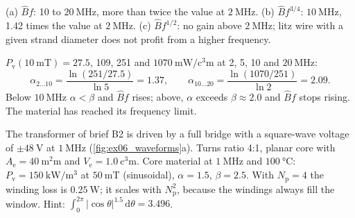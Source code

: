 
\begin{solutionblock}
	(a) $\hat{B}f$: 10 to $\SI{20}{\mega\hertz}$, more than twice the value at $\SI{2}{\mega\hertz}$. (b) $\hat{B}f^{3/4}$: $\SI{10}{\mega\hertz}$, 1.42 times the value at $\SI{2}{\mega\hertz}$. (c) $\hat{B}f^{1/2}$: no gain above $\SI{2}{\mega\hertz}$; litz wire with a given strand diameter does not profit from a higher frequency.
\end{solutionblock}


\begin{solutionblock}
	$P_\mathrm{v}(\SI{10}{\milli\tesla})=27.5$, 109, 251 and $\SI{1070}{\milli\watt\per\cubic\centi\metre}$ at 2, 5, 10 and $\SI{20}{\mega\hertz}$:
	\begin{equation}
		\alpha_{2\ldots10}=\frac{\ln(251/27.5)}{\ln5}=1.37,\qquad\alpha_{10\ldots20}=\frac{\ln(1070/251)}{\ln2}=2.09.
	\end{equation}
	Below $\SI{10}{\mega\hertz}$ $\alpha<\beta$ and $\hat{B}f$ rises; above, $\alpha$ exceeds $\beta\approx2.0$ and $\hat{B}f$ stops rising. The material has reached its frequency limit.
\end{solutionblock}



The transformer of brief B2 is driven by a full bridge with a square-wave voltage of $\pm\SI{48}{\volt}$ at $\SI{1}{\mega\hertz}$ (\autoref{fig:ex06_waveforms}a). Turns ratio 4:1, planar core with $A_\mathrm{e}=\SI{40}{\square\milli\metre}$ and $V_\mathrm{e}=\SI{1.0}{\cubic\centi\metre}$. Core material at $\SI{1}{\mega\hertz}$ and $\SI{100}{\celsius}$: $P_\mathrm{v}=\SI{150}{\kilo\watt\per\cubic\metre}$ at $\SI{50}{\milli\tesla}$ (sinusoidal), $\alpha=1.5$, $\beta=2.5$. With $N_\mathrm{p}=4$ the winding loss is $\SI{0.25}{\watt}$; it scales with $N_\mathrm{p}^2$, because the windings always fill the window. Hint: $\int_0^{2\pi}|\cos\theta|^{1.5}\,\mathrm{d}\theta=3.496$.

